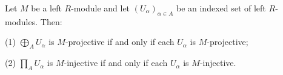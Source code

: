 Let $M$ be a left $R$-module and let $(U_\alpha)_{\alpha \in A}$ be an indexed set of left $R$-modules. Then:

(1) $\bigoplus_A U_\alpha$ is $M$-projective if and only if each $U_\alpha$ is $M$-projective;

(2) $\prod_A U_\alpha$ is $M$-injective if and only if each $U_\alpha$ is $M$-injective.
